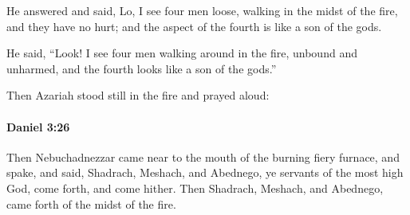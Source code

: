 			\begin{versebox}
					\item[BHS] 
					\item[LXX] 
					\item[ASV] He answered and said, Lo, I see four men loose, walking in the midst of the fire, and they have no hurt; and the aspect of the fourth is like a son of the gods.
					\item[NIV] He said, “Look! I see four men walking around in the fire, unbound and unharmed, and the fourth looks like a son of the gods.”
					\item[NRSV] Then Azariah stood still in the fire and prayed aloud:
			\end{versebox}

		\paragraph{Daniel 3:26} %
			\label{DANIEL-3-26}

			Then Nebuchadnezzar came near to the mouth of the burning fiery furnace, and spake, and said, Shadrach, Meshach, and Abednego, ye servants of the most high God, come forth, and come hither. Then Shadrach, Meshach, and Abednego, came forth of the midst of the fire.

